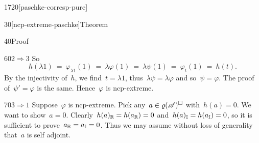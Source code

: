 \begin{parsec}{1720}[paschke-corresp-pure]
\begin{point}{30}[ncp-extreme-paschke]{Theorem}
\begin{point}{40}{Proof}
\begin{point}{60}{$2 \Rightarrow 3$}
So
\begin{equation*}
    h(\lambda 1)
    \ =\  \varphi_{\lambda1}(1) \ =\  \lambda \varphi(1) 
    \ =\  \lambda \psi(1)
    \ =\  \varphi_t (1)  \ =\  h(t).
\end{equation*}
By the injectivity of~$h$,
    we find~$t = \lambda 1$,
    thus~$\lambda \psi = \lambda \varphi$
    and so~$\psi = \varphi$.
The proof of~$\psi' = \varphi$ is the same.
Hence~$\varphi$ is ncp-extreme.
\end{point}
\begin{point}{70}{$3 \Rightarrow 1$}%
Suppose~$\varphi$ is ncp-extreme.
Pick any~$a \in \varrho(\mathscr{A})^\square$ with~$h(a) = 0$.
We want to show~$a = 0$.
Clearly~$h(a)_{\mathbb{R}} = h(a_{\mathbb{R}}) = 0$
and~$h(a)_{\mathbb{I}} = h(a_{\mathbb{I}}) = 0$,
so it is sufficient to prove~$a_{\mathbb{R}} = a_{\mathbb{I}}=0$.
Thus we may assume without loss of generality that~$a$ is self adjoint.


\end{point}
\end{point}
\end{point}
\end{parsec}
